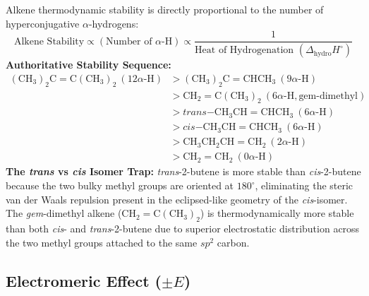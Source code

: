 \documentclass[10pt,twoside,openright]{book}
\begin{document}
\begin{formulabox}
Alkene thermodynamic stability is directly proportional to the number of hyperconjugative $\alpha$-hydrogens:
\begin{equation}
  \text{Alkene Stability} \propto (\text{Number of } \alpha\text{-H}) \propto \frac{1}{\text{Heat of Hydrogenation } (\Delta_{\mathrm{hydro}}H^\circ)}
\end{equation}
\textbf{Authoritative Stability Sequence:}
\begin{equation}
  \begin{aligned}
    \mathrm{(CH_3)_2C=C(CH_3)_2} \ (12\alpha\text{-H}) &> \mathrm{(CH_3)_2C=CHCH_3} \ (9\alpha\text{-H}) \\
    &> \mathrm{CH_2=C(CH_3)_2} \ (6\alpha\text{-H}, \text{gem-dimethyl}) \\
    &> \textit{trans}\mathrm{-CH_3CH=CHCH_3} \ (6\alpha\text{-H}) \\
    &> \textit{cis}\mathrm{-CH_3CH=CHCH_3} \ (6\alpha\text{-H}) \\
    &> \mathrm{CH_3CH_2CH=CH_2} \ (2\alpha\text{-H}) \\
    &> \mathrm{CH_2=CH_2} \ (0\alpha\text{-H})
  \end{aligned}
\end{equation}
\textbf{The \textit{trans} vs \textit{cis} Isomer Trap:} \textit{trans}-2-butene is more stable than \textit{cis}-2-butene because the two bulky methyl groups are oriented at $180^\circ$, eliminating the steric van der Waals repulsion present in the eclipsed-like geometry of the \textit{cis}-isomer. The \textit{gem}-dimethyl alkene ($\mathrm{CH_2=C(CH_3)_2}$) is thermodynamically more stable than both \textit{cis}- and \textit{trans}-2-butene due to superior electrostatic distribution across the two methyl groups attached to the same $sp^2$ carbon.
\end{formulabox}

\subsection{Electromeric Effect (\texorpdfstring{$\pm E$}{+-E})}
\end{document}
